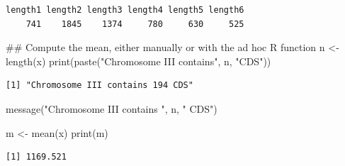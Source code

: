 \documentclass[]{article}
\newenvironment{Shaded}{\begin{snugshade}}{\end{snugshade}}
\newcommand{\KeywordTok}[1]{\textcolor[rgb]{0.94,0.87,0.69}{#1}}
\newcommand{\StringTok}[1]{\textcolor[rgb]{0.80,0.58,0.58}{#1}}
\newcommand{\NormalTok}[1]{\textcolor[rgb]{0.80,0.80,0.80}{#1}}
\begin{document}
\begin{verbatim}
length1 length2 length3 length4 length5 length6 
    741    1845    1374     780     630     525 
\end{verbatim}

\begin{Shaded}
\begin{Highlighting}[]
\NormalTok{## Compute the mean, either manually or with the ad hoc R function}
\NormalTok{n <-}\StringTok{ }\KeywordTok{length}\NormalTok{(x) }
\KeywordTok{print}\NormalTok{(}\KeywordTok{paste}\NormalTok{(}\StringTok{"Chromosome III contains"}\NormalTok{, n, }\StringTok{"CDS"}\NormalTok{))}
\end{Highlighting}
\end{Shaded}

\begin{verbatim}
[1] "Chromosome III contains 194 CDS"
\end{verbatim}

\begin{Shaded}
\begin{Highlighting}[]
\KeywordTok{message}\NormalTok{(}\StringTok{"Chromosome III contains "}\NormalTok{, n, }\StringTok{" CDS"}\NormalTok{)}

\NormalTok{m <-}\StringTok{ }\KeywordTok{mean}\NormalTok{(x)}
\KeywordTok{print}\NormalTok{(m)}
\end{Highlighting}
\end{Shaded}

\begin{verbatim}
[1] 1169.521
\end{verbatim}
\end{document}
